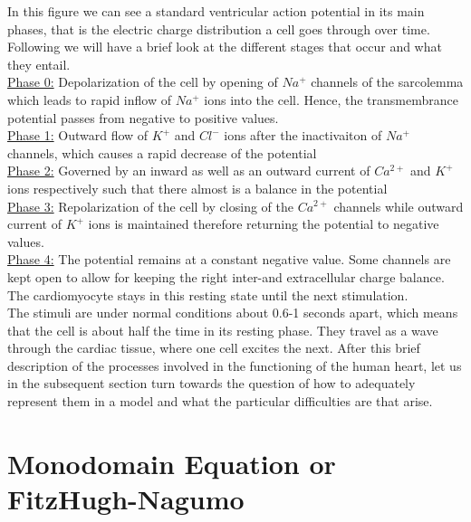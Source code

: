 \documentclass[fleqn, a4paper, 11pt, bibliography=totoc]{report}
\begin{document}
In this figure we can see a standard ventricular action potential in its main phases, that is the electric charge distribution a cell goes through over time. Following \cite{franzone2014mathematical} we will have a brief look at the different stages that occur and what they entail.
\smallskip
\\
\underline{Phase 0:} Depolarization of the cell by opening of $Na^+$ channels of the sarcolemma which leads to rapid inflow of $Na^+$ ions into the cell. Hence, the transmembrance potential passes from negative to positive values. \\
\underline{Phase 1:} Outward flow of $K^+$ and $Cl^-$ ions after the inactivaiton of $Na^+$ channels, which causes a rapid decrease of the potential \\
\underline{Phase 2:} Governed by an inward as well as an outward current of $Ca^{2+}$ and $K^+$ ions respectively such that there almost is a balance in the potential \\
\underline{Phase 3:} Repolarization of the cell by closing of the $Ca^{2+}$ channels while outward current of $K^+$ ions is maintained therefore returning the potential to negative values. \\
\underline{Phase 4:} The potential remains at a constant negative value. Some channels are kept open to allow for keeping the right inter-and extracellular charge balance. The cardiomyocyte stays in this resting state until the next stimulation. 
\smallskip
\\
The stimuli are under normal conditions about 0.6-1 seconds apart, which means that the cell is about half the time in its resting phase. They travel as a wave through the cardiac tissue, where one cell excites the next. After this brief description of the processes involved in the functioning of the human heart, let us in the subsequent section turn towards the question of how to adequately represent them in a model and what the particular difficulties are that arise.


\section{Monodomain Equation or FitzHugh-Nagumo}
\end{document}
